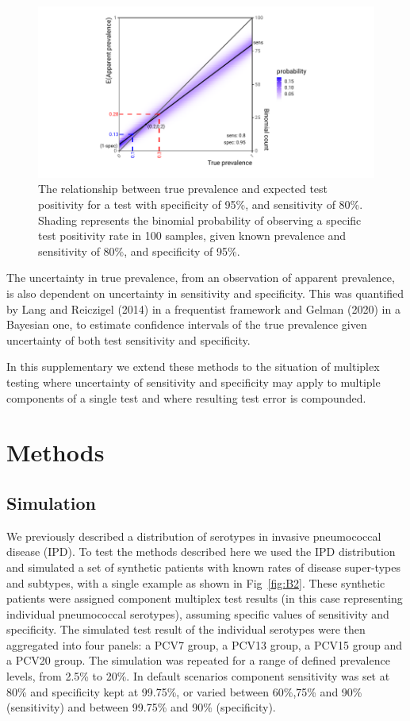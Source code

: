 \documentclass[a4paper, 12pt, twoside]{article}
\let\Oldsection\section
\renewcommand{\section}{\FloatBarrier\Oldsection}
\let\Oldsubsection\subsection
\renewcommand{\subsection}{\FloatBarrier\Oldsubsection}
\begin{document}
\begin{figure}[h!]
\centering
  \includegraphics{fig/rogan-gladen-v2}
  \caption{The relationship between true prevalence and expected test positivity for a test with specificity of 95\%, and sensitivity of 80\%. Shading represents the binomial probability of observing a specific test positivity rate in 100 samples, given known prevalence and sensitivity of 80\%, and specificity of 95\%.}
\label{fig:B1}
\end{figure}

The uncertainty in true prevalence, from an observation of apparent prevalence, is also dependent on uncertainty in sensitivity and specificity. This was quantified by Lang and Reiczigel (2014)\cite{lang2014,flor2020} in a frequentist framework and Gelman (2020)\cite{gelman2020,flor2020} in a Bayesian one, to estimate confidence intervals of the true prevalence given uncertainty of both test sensitivity and specificity.

In this supplementary we extend these methods to the situation of multiplex testing where uncertainty of sensitivity and specificity may apply to multiple components of a single test and where resulting test error is compounded.

\section{Methods}
\subsection{Simulation}

We previously described a distribution of serotypes in invasive pneumococcal disease (IPD)\cite{hyams2023a}. To test the methods described here we used the IPD distribution and simulated a set of synthetic patients with known rates of disease super-types and subtypes, with a single example as shown in Fig~\ref{fig:B2}. These synthetic patients were assigned component multiplex test results (in this case representing individual pneumococcal serotypes), assuming specific values of sensitivity and specificity. The simulated test result of the individual serotypes were then aggregated into four panels: a PCV7 group, a PCV13 group, a PCV15 group and a PCV20 group. The simulation was repeated for a range of defined prevalence levels, from 2.5\% to 20\%. In default scenarios component sensitivity was set at 80\% and specificity kept at 99.75\%, or varied between 60\%,75\% and 90\% (sensitivity) and between 99.75\% and 90\% (specificity).
\end{document}
